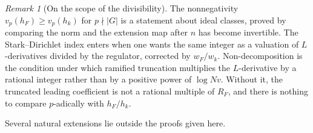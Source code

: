 \documentclass[11pt]{article}
\theoremstyle{plain}
\theoremstyle{definition}
\theoremstyle{remark}
\newtheorem{remark}[theorem]{Remark}
\begin{document}
\begin{remark}[On the scope of the divisibility]
\label{rem:scope}
The nonnegativity $v_p(h_F)\ge v_p(h_k)$ for $p\nmid|G|$ is a statement about ideal classes, proved by comparing the norm and the extension map after $n$ has become invertible.
The Stark--Dirichlet index enters when one wants the same integer as a valuation of $L$-derivatives divided by the regulator, corrected by $w_F/w_k$.
Non-decomposition is the condition under which ramified truncation multiplies the $L$-derivative by a rational integer rather than by a positive power of $\log Nv$.
Without it, the truncated leading coefficient is not a rational multiple of $R_F$, and there is nothing to compare $p$-adically with $h_F/h_k$.
\end{remark}

Several natural extensions lie outside the proofs given here.
\end{document}
